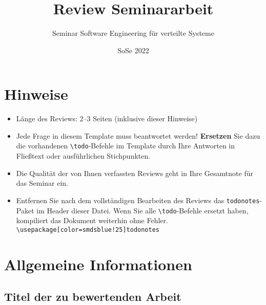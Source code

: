 \documentclass[a4paper,DIV=16]{scrartcl}
\begin{document}
\title{Review Seminararbeit}
\date{SoSe 2022}

\subtitle{Seminar Software Engineering für verteilte Systeme}

\author{}

\maketitle
\thispagestyle{empty}

\section*{Hinweise}
\begin{itemize}
\item Länge des Reviews: 2--3 Seiten (inklusive dieser Hinweise)
\item Jede Frage in diesem Template muss beantwortet werden! \textbf{Ersetzen} Sie dazu die vorhandenen \texttt{\textbackslash{}todo}-Befehle im Template durch Ihre Antworten in Fließtext oder ausführlichen Stichpunkten.
\item Die Qualität der von Ihnen verfassten Reviews geht in Ihre Gesamtnote für das Seminar ein.
\item Entfernen Sie nach dem vollständigen Bearbeiten des Reviews das \texttt{todonotes}-Paket im Header dieser Datei. Wenn Sie alle \texttt{\textbackslash{}todo}-Befehle ersetzt haben, kompiliert das Dokument weiterhin ohne Fehler.  \texttt{\textbackslash{}usepackage[color=smdsblue!25]{todonotes}}
\end{itemize}

\section*{Allgemeine Informationen}
\subsection*{Titel der zu bewertenden Arbeit}
\end{document}
